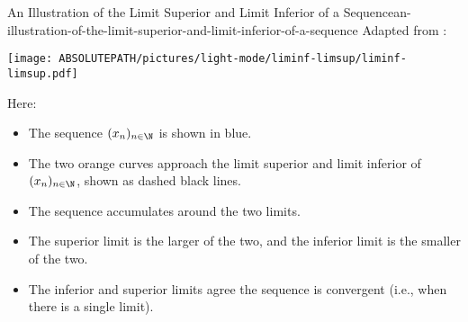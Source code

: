\begin{remark}{An Illustration of the Limit Superior and Limit Inferior of a Sequence}{an-illustration-of-the-limit-superior-and-limit-inferior-of-a-sequence}%
    Adapted from \cite{wikipedia:limit-superior-and-limit-inferior}:
    \begin{webcompile}%
        \texttt{[image: ABSOLUTEPATH/pictures/light-mode/liminf-limsup/liminf-limsup.pdf]}
    \end{webcompile}%
    Here:
    \begin{itemize}
        \item The sequence $(x_{n})_{n\in\N}$ is shown in \textcolor{OIblue}{blue}.
        \item The two \textcolor{OIvermillion}{orange} curves approach the limit superior and limit inferior of $(x_{n})_{n\in\N}$, shown as dashed black lines.
        \item The sequence accumulates around the two limits.
        \item The superior limit is the larger of the two, and the inferior limit is the smaller of the two.
        \item The inferior and superior limits agree \textiff the sequence is convergent (i.e., when there is a single limit).
    \end{itemize}
\end{remark}
